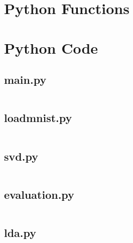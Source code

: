 \documentclass{article}
\begin{document}
    \section{Python Functions}
    

    \section{Python Code}
    \subsection{main.py}
    \inputminted{python}{../code/main.py}

    \subsection{loadmnist.py}
    \inputminted{python}{../code/loadmnist.py}

    \subsection{svd.py}
    \inputminted{python}{../code/svd.py}

    \subsection{evaluation.py}
    \inputminted{python}{../code/evaluation.py}

    \subsection{lda.py}
    \inputminted{python}{../code/lda.py}
\end{document}
